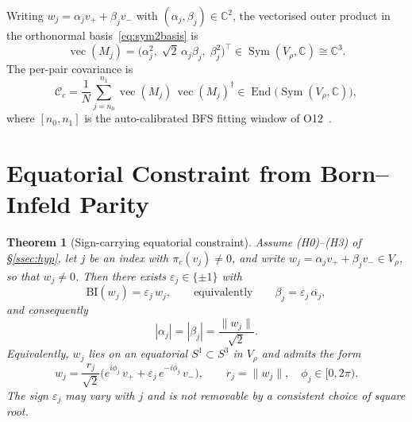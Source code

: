 \documentclass[11pt,a4paper]{article}
\newtheorem{theorem}{Theorem}[section]
\DeclareMathOperator{\Sym}{Sym}
\DeclareMathOperator{\End}{End}
\newcommand{\BI}{\mathrm{BI}}
\begin{document}
  Writing $w_j = \alpha_j v_+ + \beta_j v_-$ with $(\alpha_j, \beta_j) \in \mathbb{C}^2$, the
  vectorised outer product in the orthonormal basis~\eqref{eq:sym2basis} is
  \begin{equation}
    \label{eq:vecM}
    \operatorname{vec}(M_j) = \bigl(\alpha_j^2,\; \sqrt{2}\,\alpha_j \beta_j,\; \beta_j^2\bigr)^\top
    \in \Sym(V_\rho, \mathbb{C}) \cong \mathbb{C}^3.
  \end{equation}
  The per-pair covariance is
  \begin{equation}
    \label{eq:cov}
    \mathcal{C}_c = \frac{1}{N} \sum_{j=n_0}^{n_1}
    \operatorname{vec}(M_j)\, \operatorname{vec}(M_j)^\dagger
    \in \End\bigl(\Sym(V_\rho, \mathbb{C})\bigr),
  \end{equation}
  where $[n_0, n_1]$ is the auto-calibrated BFS fitting window of O12~\cite{Beau2026a16}.

  \section{Equatorial Constraint from Born--Infeld Parity}
  \label{sec:equatorial}

  \begin{theorem}[Sign-carrying equatorial constraint]
    \label{thm:equatorial}
    Assume (H0)--(H3) of \S\ref{ssec:hyp}, let $j$ be an index with $\pi_c(v_j) \neq 0$, and write
    $w_j = \alpha_j v_+ + \beta_j v_- \in V_\rho$, so that $w_j \neq 0$.
    Then there exists $\varepsilon_j \in \{\pm 1\}$ with
    \begin{equation}
      \label{eq:eigen-sign}
      \BI(w_j) = \varepsilon_j\, w_j ,
      \qquad\text{equivalently}\qquad
      \beta_j = \varepsilon_j\, \overline{\alpha_j} ,
    \end{equation}
    and consequently
    \begin{equation}
      \label{eq:equatorial}
      |\alpha_j| = |\beta_j| = \frac{\|w_j\|}{\sqrt{2}} .
    \end{equation}
    Equivalently, $w_j$ lies on an equatorial $S^1 \subset S^3$ in $V_\rho$ and admits the form
    \begin{equation}
      \label{eq:equatorial-form}
      w_j = \frac{r_j}{\sqrt{2}}\bigl(e^{i\phi_j}\, v_+
      + \varepsilon_j\, e^{-i\phi_j}\, v_-\bigr),
      \qquad r_j = \|w_j\|,\quad \phi_j \in [0, 2\pi).
    \end{equation}
    The sign $\varepsilon_j$ may vary with $j$ and is not removable by a consistent choice of
    square root.
  \end{theorem}
\end{document}
